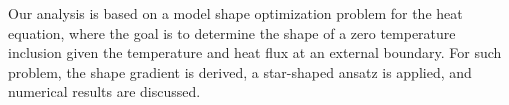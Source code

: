 \documentclass[english,a4paper,9pt,oneside]{scrbook}	%
\theoremstyle{break}
\theoremstyle{remark}
\begin{document}
Our analysis is based on a model shape optimization problem for the heat equation, where the goal is to determine the shape of a zero temperature inclusion given the temperature and heat flux at an external boundary. For such problem, the shape gradient is derived, a star-shaped ansatz is applied, and numerical results are discussed.

%
%
%



\newpage
\tableofcontents  
{}
\end{document}
